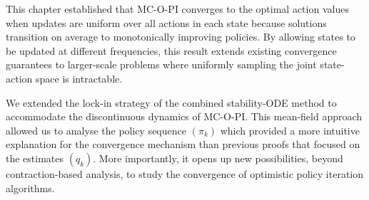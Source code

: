 This chapter established that MC-O-PI converges to the optimal action values when updates are uniform over all actions in each state because solutions transition on average to monotonically improving policies. 
By allowing states to be updated at different frequencies, this result extends existing convergence guarantees to larger-scale problems where uniformly sampling the joint state-action space is intractable.




We extended the lock-in strategy of the combined stability-ODE method to accommodate the discontinuous dynamics of MC-O-PI.
This mean-field approach allowed us to analyse the policy sequence $(\pi_k)$ which provided a more intuitive explanation for the convergence mechanism than previous proofs that focused on the estimates $(q_k)$.
More importantly, it opens up new possibilities, beyond contraction-based analysis, to study the convergence of optimistic policy iteration algorithms.







\clearpage